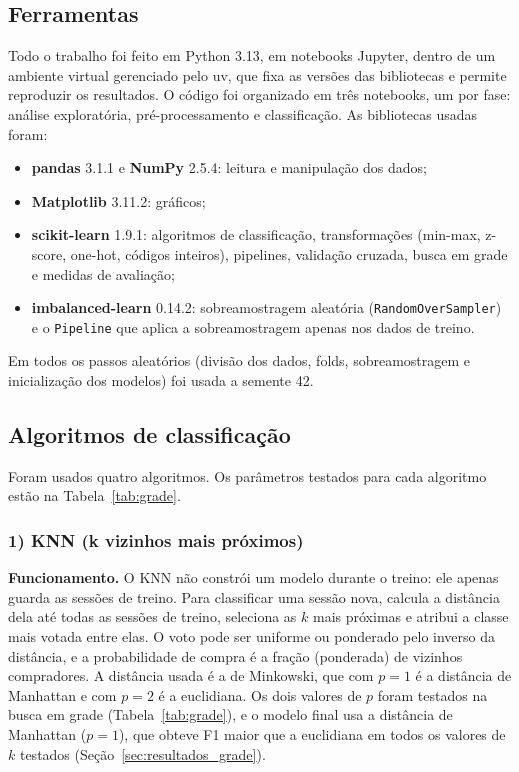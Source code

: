 \documentclass[11pt,a4paper]{article}
\DeclareRobustCommand{\atr}[1]{{\renewcommand{\_}{\textunderscore\allowbreak}\texttt{#1}}}
\begin{document}
\subsection{Ferramentas}

Todo o trabalho foi feito em Python 3.13, em notebooks Jupyter, dentro de um ambiente virtual gerenciado pelo uv, que
fixa as versões das bibliotecas e permite reproduzir os resultados. O código foi organizado em três notebooks, um por
fase: análise exploratória, pré-processamento e classificação. As bibliotecas usadas foram:
\begin{itemize}
  \item \textbf{pandas} 3.1.1 e \textbf{NumPy} 2.5.4: leitura e manipulação dos dados;
  \item \textbf{Matplotlib} 3.11.2: gráficos;
  \item \textbf{scikit-learn} 1.9.1: algoritmos de classificação, transformações (min-max, z-score, one-hot, códigos
        inteiros), pipelines, validação cruzada, busca em grade e medidas de avaliação;
  \item \textbf{imbalanced-learn} 0.14.2: sobreamostragem aleatória (\atr{RandomOverSampler}) e o \atr{Pipeline}
        que aplica a sobreamostragem apenas nos dados de treino.
\end{itemize}
Em todos os passos aleatórios (divisão dos dados, folds, sobreamostragem e inicialização dos modelos) foi usada a
semente 42.

\subsection{Algoritmos de classificação}

Foram usados quatro algoritmos. Os
parâmetros testados para cada algoritmo estão na Tabela~\ref{tab:grade}.

\subsubsection*{1) KNN (k vizinhos mais próximos)}

\textbf{Funcionamento.} O KNN não constrói um modelo durante o treino: ele apenas guarda as sessões de treino. Para
classificar uma sessão nova, calcula a distância dela até todas as sessões de treino, seleciona as $k$ mais próximas
e atribui a classe mais votada entre elas. O voto pode ser uniforme ou ponderado pelo inverso da distância, e a
probabilidade de compra é a fração (ponderada) de vizinhos compradores. A distância usada é a de Minkowski, que com
$p = 1$ é a distância de Manhattan e com $p = 2$ é a euclidiana. Os dois valores de $p$ foram testados na busca em
grade (Tabela~\ref{tab:grade}), e o modelo final usa a distância de Manhattan ($p = 1$), que obteve F1 maior que a
euclidiana em todos os valores de $k$ testados (Seção~\ref{sec:resultados_grade}).
\end{document}
